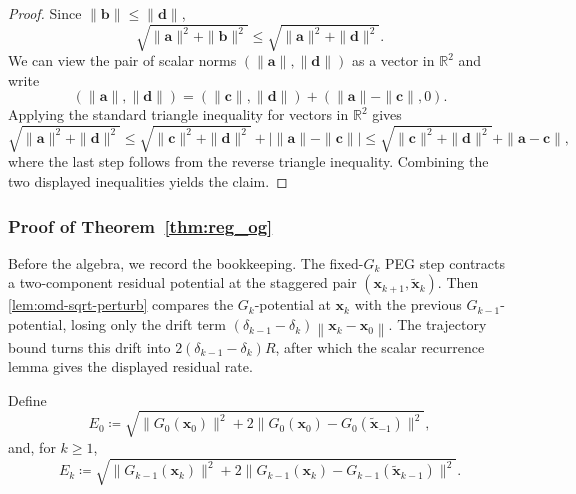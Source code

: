 \documentclass[letterpaper,11pt]{article}
\newcommand{\norm}[1]{\left\| #1 \right\|}
\newcommand{\vect}[1]{\mathbf{#1}}
\begin{document}
\begin{proof}
Since $\|\vect{b}\|\le\|\vect{d}\|$,
\[
\sqrt{\|\vect{a}\|^{2}+\|\vect{b}\|^{2}}
\le
\sqrt{\|\vect{a}\|^{2}+\|\vect{d}\|^{2}}.
\]
We can view the pair of scalar norms $(\|\vect{a}\|,\|\vect{d}\|)$ as a vector in $\mathbb{R}^{2}$ and write
\[
(\|\vect{a}\|,\|\vect{d}\|)
=
(\|\vect{c}\|,\|\vect{d}\|)+(\|\vect{a}\|-\|\vect{c}\|,0).
\]
Applying the standard triangle inequality for vectors in $\mathbb{R}^{2}$ gives
\[
\sqrt{\|\vect{a}\|^{2}+\|\vect{d}\|^{2}}
\le
\sqrt{\|\vect{c}\|^{2}+\|\vect{d}\|^{2}}
+|\|\vect{a}\|-\|\vect{c}\||
\le
\sqrt{\|\vect{c}\|^{2}+\|\vect{d}\|^{2}}
+\|\vect{a}-\vect{c}\|,
\]
where the last step follows from the reverse triangle inequality. Combining the two displayed inequalities yields the claim.
\end{proof}

\subsubsection{Proof of Theorem~\ref{thm:reg_og}}

Before the algebra, we record the bookkeeping. The fixed-\(G_k\) PEG step contracts a two-component residual potential at the staggered pair \((\vect{x}_{k+1},\tilde{\vect{x}}_k)\). Then \cref{lem:omd-sqrt-perturb} compares the \(G_k\)-potential at \(\vect{x}_k\) with the previous \(G_{k-1}\)-potential, losing only the drift term \((\delta_{k-1}-\delta_k)\norm{\vect{x}_k-\vect{x}_0}\). The trajectory bound turns this drift into \(2(\delta_{k-1}-\delta_k)R\), after which the scalar recurrence lemma gives the displayed residual rate.

Define
\[
E_0 \coloneqq
\sqrt{\|G_0(\vect{x}_0)\|^2
      +2\|G_0(\vect{x}_0)-G_0(\tilde{\vect{x}}_{-1})\|^2},
\]
and, for \(k\ge1\),
\[
E_k \coloneqq
\sqrt{\|G_{k-1}(\vect{x}_k)\|^2
      +2\|G_{k-1}(\vect{x}_k)-G_{k-1}(\tilde{\vect{x}}_{k-1})\|^2}.
\]
\end{document}
